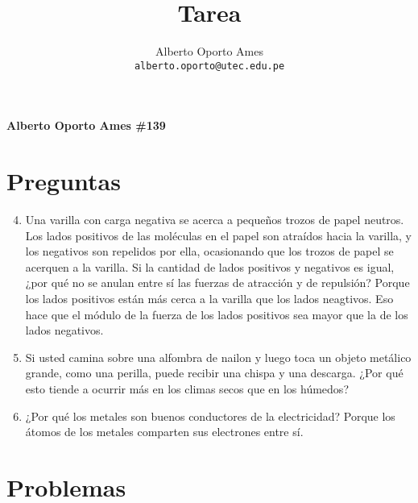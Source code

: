 \documentclass[12pt, twoside]{article}
\title{\textbf{Tarea}}
\author{
		Alberto Oporto Ames\\
		\texttt{alberto.oporto@utec.edu.pe}\\
		}
\begin{document}
\textbf{Alberto Oporto Ames \#139}
\thispagestyle{fancy}

\section{Preguntas}%
\label{sec:Preguntas}

\begin{enumerate}
	\setcounter{enumi}{3}
	\item Una varilla con carga negativa se acerca a pequeños trozos de papel neutros.
		Los lados positivos de las moléculas en el papel son atraídos hacia la varilla,
		y los negativos son repelidos por ella,
		ocasionando que los trozos de papel se acerquen a la varilla.
		Si la cantidad de lados positivos y negativos es igual,
		¿por qué no se anulan entre sí las fuerzas de atracción y de repulsión?
		\subitem Porque los lados positivos están más cerca a la varilla que los lados
			neagtivos.
			Eso hace que el módulo de la fuerza de los lados positivos sea mayor
			que la de los lados negativos.

	\item Si usted camina sobre una alfombra de nailon y luego toca un objeto metálico grande,
		como una perilla, puede recibir una chispa y una descarga.
		¿Por qué esto tiende a ocurrir más en los climas secos que en los húmedos?

	\item ¿Por qué los metales son buenos conductores de la electricidad?
		\subitem Porque los átomos de los metales comparten sus electrones entre sí.
\end{enumerate}
\section{Problemas}%
\label{sec:Problemas}
\end{document}
